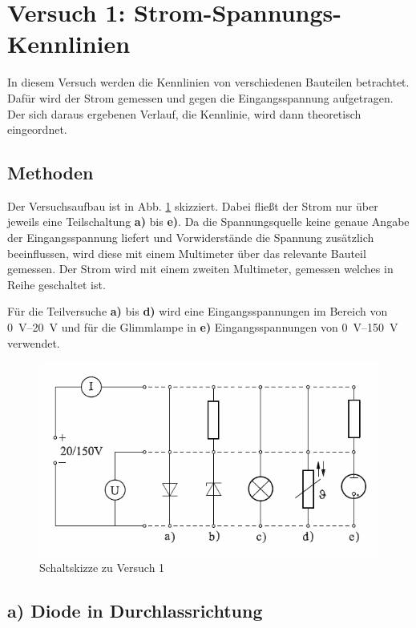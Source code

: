 \documentclass[11pt,a4paper,titlepage, ngerman]{article}
\begin{document}
		\newpage

	\section{Versuch 1: Strom-Spannungs-Kennlinien}
		
		In diesem Versuch werden die Kennlinien von verschiedenen Bauteilen betrachtet. Dafür wird der Strom gemessen und gegen die Eingangsspannung aufgetragen. Der sich daraus ergebenen Verlauf, die Kennlinie, wird dann theoretisch eingeordnet. 
		
		\subsection{Methoden} 
		
		Der Versuchsaufbau ist in Abb. \ref{Schaltskizze1} skizziert. Dabei fließt der Strom nur über jeweils eine Teilschaltung \textbf{a)} bis \textbf{e)}. 
		Da die Spannungsquelle keine genaue Angabe der Eingangsspannung liefert und Vorwiderstände die Spannung zusätzlich beeinflussen, wird diese mit einem Multimeter über das relevante Bauteil gemessen.
		Der Strom wird mit einem zweiten Multimeter, gemessen welches in Reihe geschaltet ist.
		
		Für die Teilversuche \textbf{a)} bis \textbf{d)} wird eine Eingangsspannungen im Bereich von \SIrange{0}{20}{\volt} und für die Glimmlampe in \textbf{e)} Eingangsspannungen von \SIrange{0}{150}{\volt} verwendet.
		
		\begin{figure}[ht]
			\includegraphics[width=\textwidth]{Versuch1.png}
			\caption{Schaltskizze zu Versuch 1}
			\label{Schaltskizze1}
		\end{figure}

		\subsection{a) Diode in Durchlassrichtung} 
			\label{a)}
			
\end{document}
